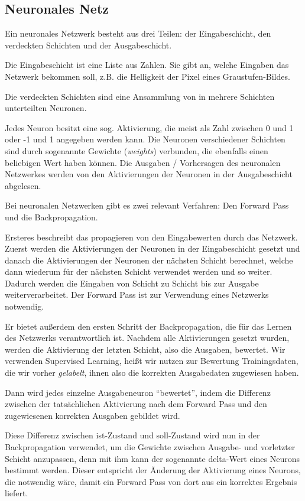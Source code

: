\documentclass[10pt]{article}
\newcommand{\eng}[1]{\textit{#1}}
\begin{document}
\subsection{Neuronales Netz}

Ein neuronales Netzwerk besteht aus drei Teilen: der Eingabeschicht, den verdeckten Schichten und der Ausgabeschicht. 

Die Eingabeschicht ist eine Liste aus Zahlen. 
Sie gibt an, welche Eingaben das Netzwerk bekommen soll, z.B. die Helligkeit der Pixel eines Graustufen-Bildes.

Die verdeckten Schichten sind eine Ansammlung von in mehrere Schichten unterteilten Neuronen.

Jedes Neuron besitzt eine sog. Aktivierung, die meist als Zahl zwischen 0 und 1 oder -1 und 1 angegeben werden kann. 
Die Neuronen verschiedener Schichten sind durch sogenannte Gewichte (\eng{weights}) verbunden, die ebenfalls einen beliebigen Wert haben können.
Die Ausgaben / Vorhersagen des neuronalen Netzwerkes werden von den Aktivierungen der Neuronen in der Ausgabeschicht abgelesen.

Bei neuronalen Netzwerken gibt es zwei relevant Verfahren: Den Forward Pass und die Backpropagation.

Ersteres beschreibt das propagieren von den Eingabewerten durch das Netzwerk.
Zuerst werden die Aktivierungen der Neuronen in der Eingabeschicht gesetzt und danach die Aktivierungen der Neuronen der nächsten Schicht berechnet, welche dann wiederum für der nächsten Schicht verwendet werden und so weiter.
Dadurch werden die Eingaben von Schicht zu Schicht bis zur Ausgabe weiterverarbeitet.
Der Forward Pass ist zur Verwendung eines Netzwerks notwendig.

Er bietet außerdem den ersten Schritt der Backpropagation, die für das Lernen des Netzwerks verantwortlich ist.
Nachdem alle Aktivierungen gesetzt wurden, werden die Aktivierung der letzten Schicht, also die Ausgaben, bewertet.
Wir verwenden Supervised Learning, heißt wir nutzen zur Bewertung Trainingsdaten, die wir vorher \eng{gelabelt}, ihnen also die korrekten Ausgabedaten zugewiesen haben.

Dann wird jedes einzelne Ausgabeneuron \enquote{bewertet}, indem die Differenz zwischen der tatsächlichen Aktivierung nach dem Forward Pass und den zugewiesenen korrekten Ausgaben gebildet wird.

Diese Differenz zwischen ist-Zustand und soll-Zustand wird nun in der Backpropagation verwendet, um die Gewichte zwischen Ausgabe- und vorletzter Schicht anzupassen, denn mit ihm kann der sogenannte delta-Wert eines Neurons bestimmt werden.
Dieser entspricht der Änderung der Aktivierung eines Neurons, die notwendig wäre, damit ein Forward Pass von dort aus ein korrektes Ergebnis liefert.
\end{document}
